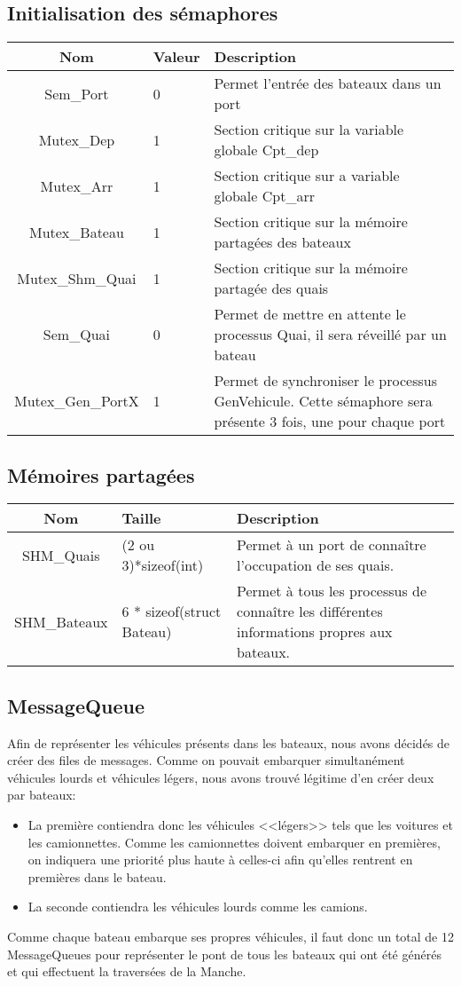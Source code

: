\documentclass[a4paper, 11pt]{article}
\begin{document}
	\subsection{Initialisation des sémaphores}
		\begin{tabularx}{15cm}{|c|p{2cm}|X|}
			\hline
			Nom & Valeur & Description \\
			\hline \hline
			Sem\_Port & 0 & Permet l'entrée des bateaux dans un port  \\ \hline
			Mutex\_Dep & 1 & Section critique sur la variable globale Cpt\_dep \\ \hline
			Mutex\_Arr & 1 & Section critique sur a variable globale Cpt\_arr \\ \hline
			Mutex\_Bateau & 1 & Section critique sur la mémoire partagées des bateaux \\ \hline
			Mutex\_Shm\_Quai & 1 & Section critique sur la mémoire partagée des quais \\ \hline
			Sem\_Quai & 0 & Permet de mettre en attente le processus Quai, il sera réveillé par un bateau \\ \hline
			Mutex\_Gen\_PortX & 1 & Permet de synchroniser le processus GenVehicule. Cette sémaphore sera présente 3 fois, une pour chaque port \\
			\hline		
		\end{tabularx}
	\subsection{Mémoires partagées} \label{shm}
		\begin{tabularx}{15cm}{|c|p{4.5cm}|X|}
			\hline
			Nom & Taille & Description \\
			\hline \hline
			SHM\_Quais & (2 ou 3)*sizeof(int) & Permet à un port de connaître l'occupation de ses quais. \\ \hline
			SHM\_Bateaux & 6 * sizeof(struct Bateau) & Permet à tous les processus de connaître les différentes informations propres aux bateaux. \\
			\hline
		\end{tabularx}
	\subsection{MessageQueue}
		Afin de représenter les véhicules présents dans les bateaux, nous avons décidés de créer des files de messages. Comme on pouvait embarquer simultanément véhicules lourds et véhicules légers, nous avons trouvé légitime d'en créer deux par bateaux: 
		\begin{itemize}
			\item La première contiendra donc les véhicules <<légers>> tels que les voitures et les camionnettes. Comme les camionnettes doivent embarquer en premières, on indiquera une priorité plus haute à celles-ci afin qu'elles rentrent en premières dans le bateau.
			\item La seconde contiendra les véhicules lourds comme les camions.
		\end{itemize}
		Comme chaque bateau embarque ses propres véhicules, il faut donc un total de 12 MessageQueues pour représenter le pont de tous les bateaux qui ont été générés et qui effectuent la traversées de la Manche.		
\end{document}
